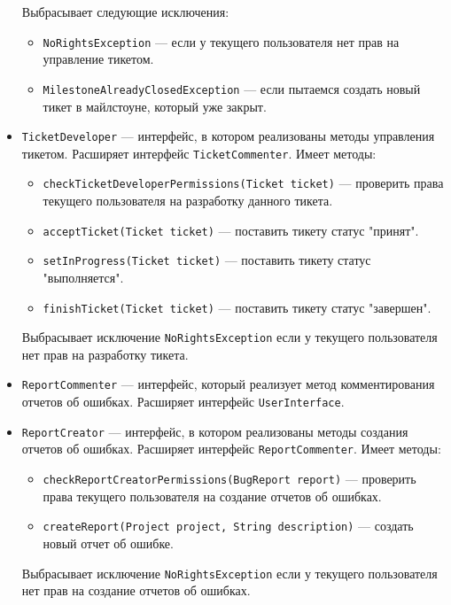\begin{itemize}
	Выбрасывает следующие исключения:
	\begin{itemize}
	\item \texttt{NoRightsException} --- если у текущего пользователя нет прав на управление тикетом.
	\item \texttt{MilestoneAlreadyClosedException} --- если пытаемся создать новый тикет в майлстоуне, который уже закрыт.
	\end{itemize}
	
\item \texttt{TicketDeveloper} --- интерфейс, в котором реализованы методы управления тикетом. Расширяет интерфейс \texttt{TicketCommenter}. Имеет методы:
	\begin{itemize}
	\item \texttt{checkTicketDeveloperPermissions(Ticket ticket)} --- проверить права текущего пользователя на разработку данного тикета.
	\item \texttt{acceptTicket(Ticket ticket)} --- поставить тикету статус "принят".
	\item \texttt{setInProgress(Ticket ticket)} --- поставить тикету статус "выполняется".	
	\item \texttt{finishTicket(Ticket ticket)} --- поставить тикету статус "завершен".
	\end{itemize}
	
	Выбрасывает исключение \texttt{NoRightsException} если у текущего пользователя нет прав на разработку тикета.

\item \texttt{ReportCommenter} --- интерфейс, который реализует метод комментирования отчетов об ошибках. Расширяет интерфейс \texttt{UserInterface}.

\item \texttt{ReportCreator} --- интерфейс, в котором реализованы методы создания отчетов об ошибках. Расширяет интерфейс \texttt{ReportCommenter}. Имеет методы:
	\begin{itemize}
	\item \texttt{checkReportCreatorPermissions(BugReport report)} --- проверить права текущего пользователя на создание отчетов об ошибках.
	\item \texttt{createReport(Project project, String description)} --- создать новый отчет об ошибке.
	\end{itemize}
	
	Выбрасывает исключение \texttt{NoRightsException} если у текущего пользователя нет прав на создание отчетов об ошибках.
	

\end{itemize}
